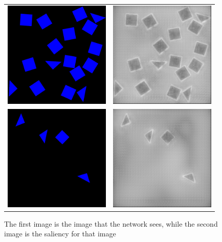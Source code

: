\begin{figure}[th]
    \begin{center}
        \begin{tabular}{c c}
            \includegraphics[width=2in, height=2in]{Counting/LaTeX/figures/putasideall/limitscaleresamplingoptionnetworkputaside/image1/touse/001.png} & \includegraphics[width=2in, height=2in]{Counting/LaTeX/figures/putasideall/limitscaleresamplingoptionnetworkputaside/image1/touse/saliency.png} \\
            \includegraphics[width=2in, height=2in]{Counting/LaTeX/figures/putasideall/limitscaleresamplingoptionnetworkputaside/image2/touse/007.png} & \includegraphics[width=2in, height=2in]{Counting/LaTeX/figures/putasideall/limitscaleresamplingoptionnetworkputaside/image2/touse/saliency.png}
        \end{tabular}
    \end{center}
    \caption{The first image is the image that the network sees, while the second image is the
             saliency for that image}
    \label{inputs}
\end{figure}

